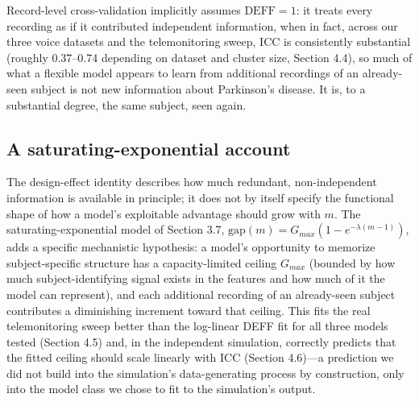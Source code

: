 \documentclass[11pt]{article}
\begin{document}
Record-level cross-validation implicitly assumes $\mathrm{DEFF}=1$: it treats every recording as if it contributed independent information, when in fact, across our three voice datasets and the telemonitoring sweep, ICC is consistently substantial (roughly 0.37--0.74 depending on dataset and cluster size, Section 4.4), so much of what a flexible model appears to learn from additional recordings of an already-seen subject is not new information about Parkinson's disease. It is, to a substantial degree, the same subject, seen again.

\subsection{A saturating-exponential account}
The design-effect identity describes how much redundant, non-independent information is available in principle; it does not by itself specify the functional shape of how a model's exploitable advantage should grow with $m$. The saturating-exponential model of Section 3.7, $\mathrm{gap}(m) = G_{max}(1-e^{-\lambda(m-1)})$, adds a specific mechanistic hypothesis: a model's opportunity to memorize subject-specific structure has a capacity-limited ceiling $G_{max}$ (bounded by how much subject-identifying signal exists in the features and how much of it the model can represent), and each additional recording of an already-seen subject contributes a diminishing increment toward that ceiling. This fits the real telemonitoring sweep better than the log-linear DEFF fit for all three models tested (Section 4.5) and, in the independent simulation, correctly predicts that the fitted ceiling should scale linearly with ICC (Section 4.6)---a prediction we did not build into the simulation's data-generating process by construction, only into the model class we chose to fit to the simulation's output.
\end{document}
